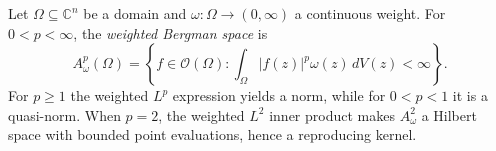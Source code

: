 
Let $\Omega\subseteq\mathbb C^n$ be a domain and $\omega:\Omega\to(0,\infty)$ a continuous weight. For $0<p<\infty$, the \emph{weighted Bergman space} is
\[
A_\omega^p(\Omega)=\left\{f\in\mathcal O(\Omega):\int_\Omega |f(z)|^p\omega(z)\,dV(z)<\infty\right\}.
\]
For $p\ge1$ the weighted $L^p$ expression yields a norm, while for $0<p<1$ it is a quasi-norm. When $p=2$, the weighted $L^2$ inner product makes $A_\omega^2$ a Hilbert space with bounded point evaluations, hence a reproducing kernel.
